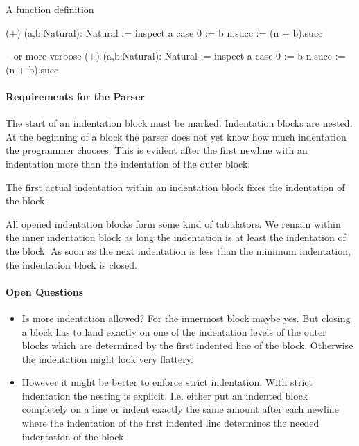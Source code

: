 A function definition
\begin{alba}
  (+) (a,b:Natural): Natural :=
    inspect a case
      0 := b
      n.succ :=
        (n + b).succ

  -- or more verbose
  (+) (a,b:Natural): Natural :=
    inspect
      a
    case
      0 := b
      n.succ :=
        (n + b).succ
\end{alba}


\paragraph{Requirements for the Parser}
The start of an indentation block must be marked. Indentation blocks are
nested. At the beginning of a block the parser does not yet know how much
indentation the programmer chooses. This is evident after the first newline
with an indentation more than the indentation of the outer block.

The first actual indentation within an indentation block fixes the indentation
of the block.

All opened indentation blocks form some kind of tabulators. We remain within
the inner indentation block as long the indentation is at least the
indentation of the block. As soon as the next indentation is less than the
minimum indentation, the indentation block is closed.


\paragraph{Open Questions}
\begin{itemize}
\item Is more indentation allowed? For the innermost block maybe yes. But
  closing a block has to land exactly on one of the indentation levels of the
  outer blocks which are determined by the first indented line of the
  block. Otherwise the indentation might look very flattery.

\item
  However it might be better to enforce strict indentation. With strict
  indentation the nesting is explicit. I.e. either put an indented block
  completely on a line or indent exactly the same amount after each newline
  where the indentation of the first indented line determines the needed
  indentation of the block.
\end{itemize}













